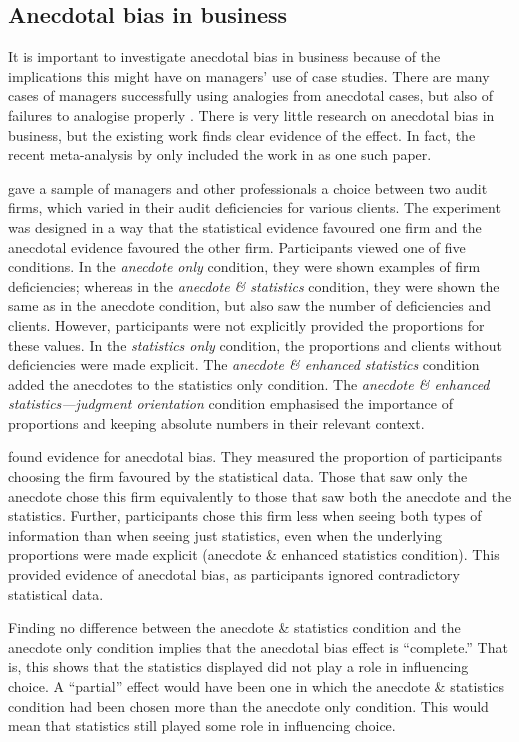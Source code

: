 \documentclass[a4paper, nobind, dvipsnames]{templates/ociamthesis}
\theoremstyle{definition}
\theoremstyle{definition}
\theoremstyle{definition}
\theoremstyle{definition}
\theoremstyle{remark}
\begin{document}
\subsection{Anecdotal bias in business}

It is important to investigate anecdotal bias in business because of the
implications this might have on managers' use of case studies. There are many
cases of managers successfully using analogies from anecdotal cases, but also of
failures to analogise properly \autocite{gavetti2005,gavetti2005a}. There is very
little research on anecdotal bias in business, but the existing work finds clear
evidence of the effect. In fact, the recent meta-analysis by \textcite{freling2020} only
included the work in \textcite{wainberg2013} as one such paper.

\textcite{wainberg2013} gave a sample of managers and other professionals a choice between
two audit firms, which varied in their audit deficiencies for various clients.
The experiment was designed in a way that the statistical evidence favoured one
firm and the anecdotal evidence favoured the other firm. Participants viewed one
of five conditions. In the \emph{anecdote only} condition, they were shown examples
of firm deficiencies; whereas in the \emph{anecdote \& statistics} condition, they
were shown the same as in the anecdote condition, but also saw the number of
deficiencies and clients. However, participants were not explicitly provided the
proportions for these values. In the \emph{statistics only} condition, the
proportions and clients without deficiencies were made explicit. The \emph{anecdote \&
enhanced statistics} condition added the anecdotes to the statistics only
condition. The \emph{anecdote \& enhanced statistics---judgment orientation} condition
emphasised the importance of proportions and keeping absolute numbers in their
relevant context.

\textcite{wainberg2013} found evidence for anecdotal bias. They measured the proportion of
participants choosing the firm favoured by the statistical data. Those that saw
only the anecdote chose this firm equivalently to those that saw both the
anecdote and the statistics. Further, participants chose this firm less when
seeing both types of information than when seeing just statistics, even when the
underlying proportions were made explicit (anecdote \& enhanced statistics
condition). This provided evidence of anecdotal bias, as participants ignored
contradictory statistical data.

Finding no difference between the anecdote \& statistics condition and the
anecdote only condition implies that the anecdotal bias effect is ``complete.''
That is, this shows that the statistics displayed did not play a role in
influencing choice. A ``partial'' effect would have been one in which the anecdote
\& statistics condition had been chosen more than the anecdote only condition.
This would mean that statistics still played some role in influencing choice.
\end{document}
